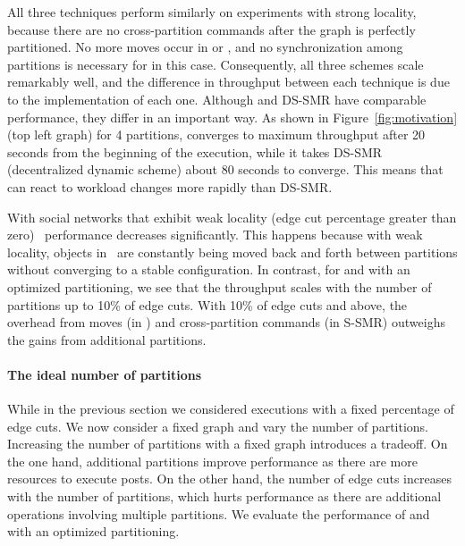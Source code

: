 All three techniques perform similarly on experiments with
strong locality, because there are no cross-partition commands after
the graph is perfectly partitioned. No more moves occur in
\dynastar or \dssmr, and no synchronization among partitions is
necessary for \ssmr in this case. 
Consequently, all three schemes scale remarkably well, and
the difference in throughput between each technique is due to the implementation of each one.
Although \dynastar and DS-SMR have comparable performance, they differ in an important way. 
As shown in Figure~\ref{fig:motivation} (top left graph) for 4 partitions, \dynastar converges 
to maximum throughput after 20 seconds from the beginning of the execution, while it takes 
DS-SMR (decentralized dynamic scheme) about 80 seconds to converge.
This means that \dynastar can react to workload changes more rapidly than DS-SMR.

With social networks that exhibit weak locality (edge cut percentage greater than zero) \dssmr\ performance decreases significantly.  
This happens because with weak locality, objects in \dssmr\ are constantly being moved back and forth between partitions 
without converging to a stable configuration.
In contrast, for \dynastar and \ssmr with an optimized partitioning, we see that the throughput scales with the number of partitions up to 10\% of edge cuts. 
With 10\% of edge cuts and above, the overhead from moves (in \dynastar) and cross-partition commands (in S-SMR) outweighs the gains from additional partitions.



\paragraph*{The ideal number of partitions}
\label{sec:evaluation:results}

While in the previous section we considered executions with a fixed percentage of edge cuts.
We now consider a fixed graph and vary the number of partitions.
Increasing the number of partitions with a fixed graph introduces a tradeoff.
On the one hand, additional partitions improve performance as there are more resources to execute posts.
On the other hand, the number of edge cuts increases with the number of partitions, which hurts performance as there are additional operations involving multiple partitions.
We evaluate the performance of \dynastar and \ssmr with an optimized partitioning.%


